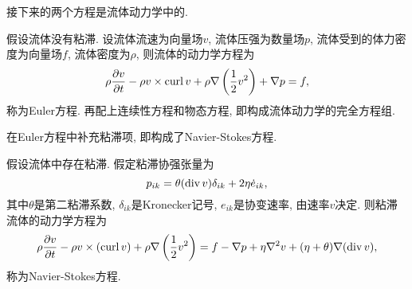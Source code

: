 接下来的两个方程是流体动力学中的.

\begin{example}
    假设流体没有粘滞. 设流体流速为向量场$v$, 流体压强为数量场$p$, 流体受到的体力密度为向量场$f$, 流体密度为$\rho$, 则流体的动力学方程为
    \begin{equation}
        \rho\pdiff{v}{t}-\rho v\times \curl v + \rho\nabla\lr(){\frac{1}{2}v^2}+\nabla p = f,
    \end{equation}
    称为Euler方程. 再配上连续性方程和物态方程, 即构成流体动力学的完全方程组.
\end{example}

在Euler方程中补充粘滞项, 即构成了Navier-Stokes方程.

\begin{example}
    假设流体中存在粘滞. 假定粘滞协强张量为
    \begin{equation}
        p_{ik} = \theta(\divv v)\delta_{ik}+2\eta\dot{e}_{ik},
    \end{equation}
    其中$\theta$是第二粘滞系数, $\delta_{ik}$是Kronecker记号, $e_{ik}$是协变速率, 由速率$v$决定. 则粘滞流体的动力学方程为
    \begin{equation}
        \rho\pdiff{v}{t}-\rho v\times (\curl v) + \rho\nabla\lr(){\frac{1}{2}v^2} = f-\nabla p+\eta \nabla^2v+(\eta+\theta)\nabla (\divv v),
    \end{equation}
    称为Navier-Stokes方程.
\end{example}
